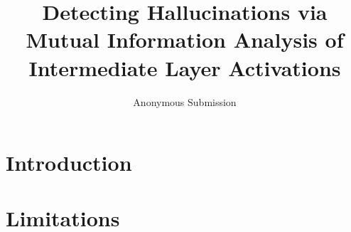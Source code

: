 \documentclass[11pt]{article}
\title{Detecting Hallucinations via Mutual Information Analysis
       of Intermediate Layer Activations}
\author{Anonymous Submission}
\begin{document}
\maketitle

\begin{abstract}

\end{abstract}

\section{Introduction}
\label{sec:intro}


\section*{Limitations}


% 

% 

% 
\end{document}
